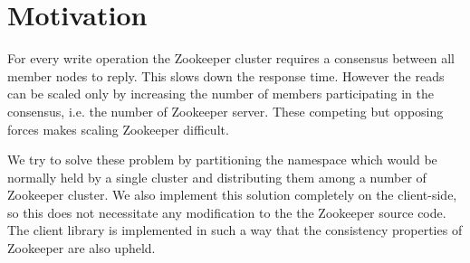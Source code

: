 \chapter{Motivation}
For every write operation the Zookeeper cluster requires a consensus between all member nodes to reply. This slows down the response time. However the reads can be scaled only by increasing the number of members participating in the consensus, i.e. the number of Zookeeper server. These competing but opposing forces makes scaling Zookeeper difficult. 

We try to solve these problem by partitioning the namespace which would be normally held by a single cluster and distributing them among a number of Zookeeper cluster. We also implement this solution completely on the client-side, so this does not necessitate any modification to the the Zookeeper source code. The client library is implemented in such a way that the consistency properties of Zookeeper are also upheld.
